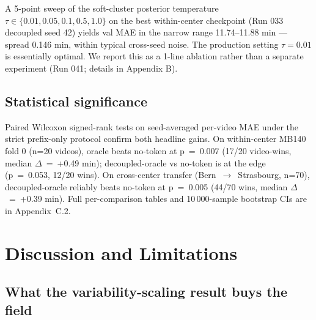 A 5-point sweep of the soft-cluster posterior temperature
\(\tau \in \{0.01, 0.05, 0.1, 0.5, 1.0\}\) on the best within-center
checkpoint (Run 033 decoupled seed 42) yields val MAE in the narrow
range 11.74--11.88 min --- spread 0.146 min, within typical cross-seed
noise. The production setting \(\tau = 0.01\) is essentially optimal. We
report this as a 1-line ablation rather than a separate experiment (Run
041; details in Appendix B).

\subsection{Statistical significance}\label{statistical-significance}

Paired Wilcoxon signed-rank tests on seed-averaged per-video MAE under
the strict prefix-only protocol confirm both headline gains. On
within-center MB140 fold 0 (n=20 videos), oracle beats no-token at
p~=~0.007 (17/20 video-wins, median $\Delta$~=~+0.49 min); decoupled-oracle
vs no-token is at the edge (p~=~0.053, 12/20 wins). On cross-center
transfer (Bern~$\rightarrow$~Strasbourg, n=70), decoupled-oracle reliably beats
no-token at p~=~0.005 (44/70 wins, median $\Delta$~=~+0.39 min). Full
per-comparison tables and 10\,000-sample bootstrap CIs are in
Appendix~C.2.

\section{Discussion and Limitations}\label{discussion}\label{limitations}

\subsection{What the variability-scaling result buys the field}\label{significance-what-the-variability-scaling-result-actually-buys-the-field}


